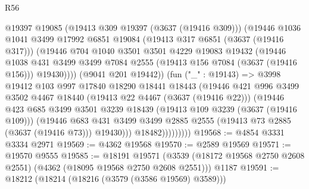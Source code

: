 \begin{lexlean}{R56}
\begin{coremodule}
                        @19397
                        @19085
                        (@19413 @309 @19397 (@3637 (@19416 @309)))
                        (@19446
                          @1036
                          @1041
                          @3499
                          @17992
                          @6851
                          @19084
                          (@19413 @317 @6851 (@3637 (@19416 @317)))
                          (@19446
                            @704
                            @1040
                            @3501
                            @3501
                            @4229
                            @19083
                            @19432
                            (@19446
                              @1038
                              @431
                              @3499
                              @3499
                              @7084
                              @2555
                              (@19413 @156 @7084 (@3637 (@19416 @156)))
                              @19430))))
                      (@9041 @201 @19442))
                    (fun ("_" : @19143) =>
                    @3998
                      @19412
                      @103
                      @997
                      @17840
                      @18290
                      @18441
                      @18443
                      (@19446
                        @421
                        @996
                        @3499
                        @3502
                        @4467
                        @18440
                        (@19413 @22 @4467 (@3637 (@19416 @22)))
                        (@19446
                          @423
                          @685
                          @3499
                          @3501
                          @3239
                          @18439
                          (@19413 @109 @3239 (@3637 (@19416 @109)))
                          (@19446
                            @683
                            @431
                            @3499
                            @3499
                            @2885
                            @2555
                            (@19413 @73 @2885 (@3637 (@19416 @73)))
                            @19430)))
                      @18482)))))))))
@19568 := @4854 @3331 @3334 @2971
@19569 := @4362 @19568
@19570 := @2589 @19569
@19571 := @19570 @9555
@19585 := @18191
    @19571
    (@3539 (@18172 @19568 @2750 @2608 @2551) (@4362 (@18095 @19568 @2750 @2608 @2551)))
    @1187
@19591 := @18212 (@18214 (@18216 (@3579 (@3586 @19569) @3589)))

\end{coremodule}
\end{lexlean}
